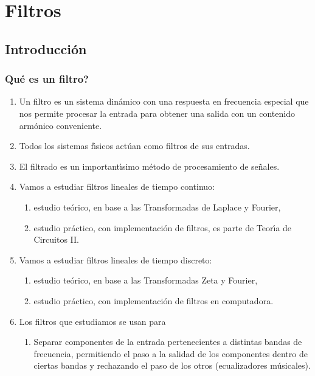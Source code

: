 \chapter{Filtros}

\section{Introducci\'{o}n}

\subsection{\textquestiondown Qu\'{e} es un filtro?}

\begin{enumerate} 

\item Un filtro es un sistema din\'{a}mico con una respuesta en frecuencia especial que nos permite procesar la entrada para obtener una salida con un contenido arm\'{o}nico conveniente.

\item   Todos los sistemas f\'{\i}sicos act\'{u}an como filtros de sus entradas.
        
\item   El filtrado es un important\'{\i}simo m\'{e}todo de procesamiento de se\~{n}ales.

\item   Vamos a estudiar filtros lineales de tiempo continuo:
  \begin{enumerate}
  \item   estudio te\'{o}rico, en base a las Transformadas de Laplace y Fourier,
    
  \item   estudio pr\'{a}ctico, con implementaci\'{o}n de filtros, es parte de Teor\'{\i}a de Circuitos II.
  \end{enumerate}
        
\item   Vamos a estudiar filtros lineales de tiempo discreto: 
  \begin{enumerate}
  \item   estudio te\'{o}rico, en base a las Transformadas Zeta y Fourier,
    
  \item   estudio pr\'{a}ctico, con implementaci\'{o}n de filtros en computadora.
  \end{enumerate}

\item Los filtros que estudiamos se usan para
\begin{enumerate}
\item   Separar componentes de la entrada pertenecientes a distintas bandas de frecuencia, 
permitiendo el paso a la salidad de los componentes dentro de ciertas bandas y rechazando 
el paso de los otros (ecualizadores m\'{u}sicales).
                

\end{enumerate}
\end{enumerate}
